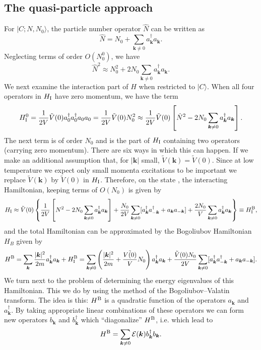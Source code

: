 \subsection{The quasi-particle approach}
For $|C;N,N_0\rangle$, the particle number operator $\hat{N}$ can be written as
\[\hat{N} = N_0 + \sum_{\bm{k}\neq 0}a_{\bm{k}}^{\dagger} a_{\bm{k}} .\]
Neglecting terms of order $O(N_0^0)$, we have
\[\hat{N}^2 \approx N_0^2 + 2N_0\sum_{\bm{k}\neq 0}a_{\bm{k}}^{\dagger} a_{\bm{k}} .\]
We next examine the interaction part of $H$ when restricted to $|C\rangle$. When all four operators in $H_{\rm I}$ have zero momentum, we have the term
\[H_{\rm I}^0 = \frac{1}{2V} \tilde{V}(0) a^{\dagger}_{0} a^{\dagger}_{0} a_{0} a_{0} = \frac{1}{2V}\tilde{V}(0)N_0^2 \approx  \frac{1}{2V}\tilde{V}(0) \left[\hat{N}^2-2N_0\sum_{\bm{k}\neq 0}a_{\bm{k}}^{\dagger} a_{\bm{k}} \right].\]
The next term is of order $N_0$ and is the part of $H_{\rm I}$ containing two operators (carrying zero momentum). There are six ways in which this can happen. If we make an additional assumption that, for $|\bm{k}|$ small, $\tilde{V}(\bm{k}) = \tilde{V}(0)$. 
Since at low temperature we expect only small momenta excitations to be important we replace $\tilde{V}(\bm{k})$ by $\tilde{V}(0)$ in $H_{\rm I}$. Therefore, on the state , the interacting Hamiltonian, keeping terms of $O(N_0)$ is given by
\[H_{\rm I} \approx \tilde{V}(0) \left\{ \frac{1}{2V}\left[N^2-2N_0\sum_{\bm{k}\neq 0}a_{\bm{k}}^{\dagger} a_{\bm{k}} \right]  +\frac{N_0}{2V}\sum_{\bm{k}\neq 0} [a^{\dagger}_{\bm{k}} a^{\dagger}_{-\bm{k}} + a_{\bm{k}} a_{-\bm{k}}] +\frac{2N_0}{V} \sum_{\bm{k}\neq 0}a_{\bm{k}}^{\dagger} a_{\bm{k}} \right\} \equiv H_{\rm I}^{\rm B} ,\] 
and the total Hamiltonian can be approximated by the Bogoliubov Hamiltonian $H_B$ given by
\[H^{\rm B} = \sum_{\bm{k}} \frac{|\bm{k}|^2}{2m} a_{\bm{k}}^{\dagger} a_{\bm{k}} + H_{\rm I}^{\rm B} = \sum_{\bm{k}\neq 0} \left(\frac{|\bm{k}|^2}{2m} + \frac{\tilde{V(0)}}{V}N_0 \right)a_{\bm{k}}^{\dagger} a_{\bm{k}}  + \frac{\tilde{V}(0)N_0}{2V} \sum_{\bm{k}\neq 0} [a^{\dagger}_{\bm{k}} a^{\dagger}_{-\bm{k}} + a_{\bm{k}} a_{-\bm{k}}].\]
We turn next to the problem of determining the energy eigenvalues of this Hamiltonian. This we do by using the method of the Bogoliubov–Valatin transform. 
The idea is this: $H^{\rm B}$ is a quadratic function of the operators $a_{\bm{k}}$ and $a^{\dagger}_{\bm{k}}$. 
By taking appropriate linear combinations of these operators we can form new operators $b_{\bm{k}}$ and $b^{\dagger}_{\bm{k}}$ which ``diagonalize'' $H^{\rm B}$, i.e. which lead to
\[H^{\rm B} = \sum_{\bm{k} \neq 0} \mathcal{E}(\bm{k})b^{\dagger}_{\bm{k}} b_{\bm{k}} .\]
